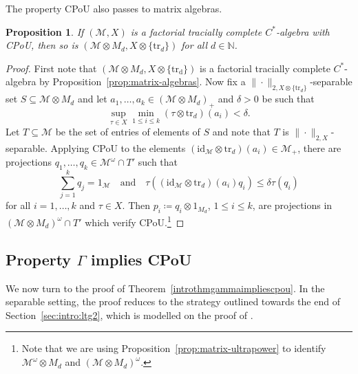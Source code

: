 \documentclass[a4paper,11pt]{amsart}
\newtheorem{proposition}[theorem]{Proposition}
\theoremstyle{definition}
\numberwithin{equation}{section}
\numberwithin{theorem}{section}
\newcommand{\M}{\mathcal{M}}
\begin{document}
The property CPoU also passes to matrix algebras.

\begin{proposition}\label{prop:matrix-CPoU}
	If $(\M, X)$ is a factorial tracially complete $C^*$-algebra with CPoU, then so is $(\M \otimes M_d, X \otimes \{\mathrm{tr}_d\})$ for all $d \in \mathbb N$.
\end{proposition}

\begin{proof}
	First note that $(\M \otimes M_d, X \otimes \{\mathrm{tr_d}\})$ is a factorial tracially complete $C^*$-algebra by Proposition~\ref{prop:matrix-algebras}.  Now fix a $\|\cdot\|_{2, X \otimes \{\mathrm{tr}_d\}}$-separable set $S \subseteq \M \otimes M_d$ and let $a_1, \ldots, a_k \in (\M \otimes M_d)_+$ and $\delta > 0$ be such that
	\begin{equation}
		\sup_{\tau \in X} \min_{1 \leq i \leq k} (\tau \otimes \mathrm{tr}_d)(a_i) < \delta.
	\end{equation}
	Let $T \subseteq \M$ be the set of entries of elements of $S$ and note that $T$ is $\|\cdot\|_{2, X}$-separable.  Applying CPoU to the elements $(\mathrm{id}_\M \otimes \mathrm{tr}_d)(a_i) \in \M_+$, there are projections $q_1, \ldots, q_k \in \M^\omega \cap T'$ such that
	\begin{equation}
		\sum_{j=1}^k q_j = 1_\M \quad \text{and} \quad \tau((\mathrm{id}_\M \otimes \mathrm{tr}_d)(a_i)q_i) \leq \delta\tau(q_i)
	\end{equation}
	for all $i = 1, \dots, k$ and $\tau \in X$.  Then $p_i \coloneqq q_i \otimes 1_{M_d}$, $1 \leq i \leq k$, are projections in $(\M \otimes M_d)^\omega \cap T'$ which verify CPoU.\footnote{Note that we are using Proposition~\ref{prop:matrix-ultrapower} to identify $\M^\omega \otimes M_d$ and $(\M \otimes M_d)^\omega$.}
\end{proof}

\subsection{Property \texorpdfstring{$\Gamma$}{Gamma} implies CPoU}\label{sec:CPoU-proof}

We now turn to the proof of Theorem~\ref{introthmgammaimpliescpou}. 
In the separable setting, the proof reduces to the strategy outlined towards the end of Section~\ref{sec:intro:ltg2}, which is modelled on the proof of \cite[Theorem~3.8]{CETWW}.  
\end{document}
